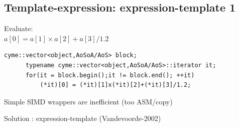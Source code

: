 \documentclass{beamer}
\begin{document}
\subsection*{Template-expression: expression-template 1}
\begin{frame}[fragile]
Evaluate: \\
\centering
$\boxed{a[0] = a[1]  \times a[2]  +a[3]/1.2}$

\vspace{0.5cm}

\begin{lstlisting}[flexiblecolumns=true,basicstyle=\sffamily]     
      cyme::vector<object,AoSoA/AoS> block;
      typename cyme::vector<object,AoSoA/AoS>::iterator it;
      for(it = block.begin();it != block.end(); ++it)
          (*it)[0] = (*it)[1]x(*it)[2]+(*it)[3]/1.2;
\end{lstlisting}
\vspace{0.5cm}

Simple SIMD wrappers are inefficient (too ASM/copy)

Solution : expression-template (Vandevoorde-2002)




\end{frame}



\end{document}
